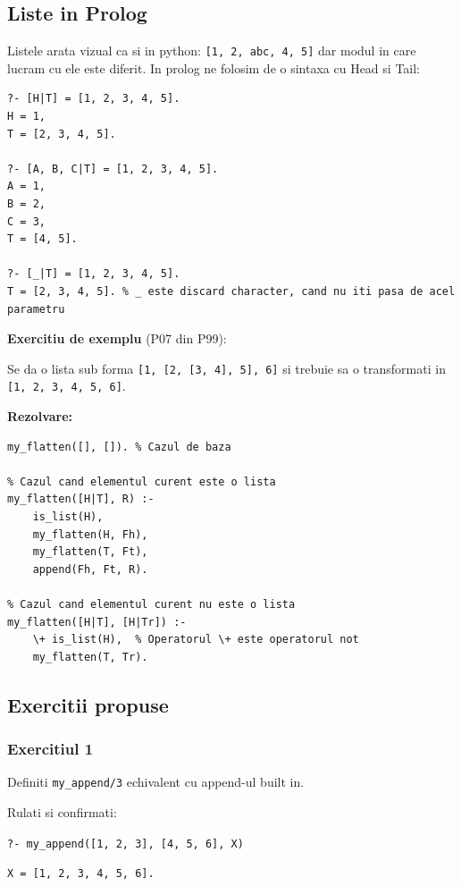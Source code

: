\subsection*{Liste in Prolog}
Listele arata vizual ca si in python: \texttt{[1, 2, abc, 4, 5]} dar modul in care lucram cu ele este diferit. In prolog ne folosim de o sintaxa cu Head si Tail:
\begin{lstlisting}[caption={Liste in prolog}]
?- [H|T] = [1, 2, 3, 4, 5].
H = 1,
T = [2, 3, 4, 5].

?- [A, B, C|T] = [1, 2, 3, 4, 5].
A = 1,
B = 2,
C = 3,
T = [4, 5].

?- [_|T] = [1, 2, 3, 4, 5].
T = [2, 3, 4, 5]. % _ este discard character, cand nu iti pasa de acel parametru
\end{lstlisting}


\textbf{Exercitiu de exemplu} (P07 din P99):

Se da o lista sub forma \texttt{[1, [2, [3, 4], 5], 6]} si trebuie sa o transformati in \texttt{[1, 2, 3, 4, 5, 6]}.

\textbf{Rezolvare:}

\newpage

\begin{lstlisting}[caption={Exercitiu Flatten List}]
my_flatten([], []). % Cazul de baza

% Cazul cand elementul curent este o lista
my_flatten([H|T], R) :-
    is_list(H),
    my_flatten(H, Fh),
    my_flatten(T, Ft),
    append(Fh, Ft, R).

% Cazul cand elementul curent nu este o lista
my_flatten([H|T], [H|Tr]) :-
    \+ is_list(H),  % Operatorul \+ este operatorul not
    my_flatten(T, Tr).
\end{lstlisting}

\subsection*{Exercitii propuse}

\subsubsection*{Exercitiul 1}

Definiti \texttt{my\_append/3} echivalent cu append-ul built in.

Rulati si confirmati:

\texttt{?- my\_append([1, 2, 3], [4, 5, 6], X)}

\texttt{X = [1, 2, 3, 4, 5, 6].}


